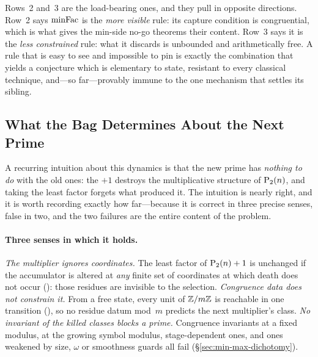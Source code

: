 \smallskip\noindent
Rows~2 and~3 are the load-bearing ones, and they pull in opposite
directions.  Row~2 says $\mathrm{minFac}$ is the \emph{more visible} rule: its
capture condition is congruential, which is what gives the min-side
no-go theorems their content.  Row~3 says it is the \emph{less
constrained} rule: what it discards is unbounded and arithmetically
free.  A rule that is easy to see and impossible to pin is exactly the
combination that yields a conjecture which is elementary to state,
resistant to every classical technique, and---so far---provably immune
to the one mechanism that settles its sibling.

\subsection{What the Bag Determines About the Next Prime}
\label{sec:bag-information}

A recurring intuition about this dynamics is that the new prime has
\emph{nothing to do} with the old ones: the $+1$ destroys the
multiplicative structure of $\mathrm{P}_{2}(n)$, and taking the least factor
forgets what produced it.  The intuition is nearly right, and it is
worth recording exactly how far---because it is correct in three precise
senses, false in two, and the two failures are the entire content of the
problem.

\paragraph{Three senses in which it holds.}
\emph{The multiplier ignores coordinates.}  The least factor of
$\mathrm{P}_{2}(n)+1$ is unchanged if the accumulator is altered at \emph{any}
finite set of coordinates at which death does not occur
(): those
residues are invisible to the selection.  \emph{Congruence data does not
constrain it.}  From a free state, every unit of $\mathbb{Z}/m\mathbb{Z}$ is reachable
in one transition
(), so no residue
datum mod~$m$ predicts the next multiplier's class.  \emph{No invariant
of the killed classes blocks a prime.}  Congruence invariants at a fixed
modulus, at the growing symbol modulus, stage-dependent ones, and ones
weakened by size, $\omega$ or smoothness guards all fail
(\S\ref{sec:min-max-dichotomy}).

